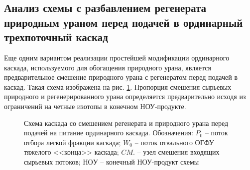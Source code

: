 \subsection{Анализ схемы с разбавлением регенерата природным ураном перед подачей в ординарный трехпоточный каскад}

Еще одним вариантом реализации простейшей модификации ординарного каскада, используемого для обогащения природного урана, является предварительное смешение природного урана с регенератом перед подачей в каскад. Такая схема изображена на рис. \ref{o3}. Пропорция смешения сырьевых природного и регенерированного урана  определяется предварительно исходя из ограничений на четные изотопы в конечном НОУ-продукте.

\begin{figure}[ht]
  \caption{Схема каскада со смешением регенерата и природного урана перед подачей на питание ординарного каскада. Обозначения: $P_0$ -- поток отбора легкой фракции каскада; $W_0$ -- поток отвального ОГФУ тяжелого <<конца>> каскада; $CM.$ -- узел смешения входящих сырьевых потоков; $НОУ$ -- конечный НОУ-продукт схемы}\label{o3}
\end{figure}

